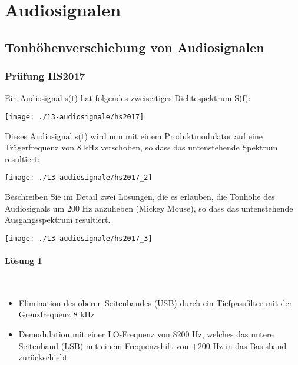 

\section{Audiosignalen}

\subsection{Tonhöhenverschiebung von Audiosignalen}
\subsubsection{Prüfung HS2017}
Ein Audiosignal s(t) hat folgendes zweiseitiges Dichtespektrum S(f):

\begin{center}
    \vspace{-8pt}
    \texttt{[image: ./13-audiosignale/hs2017]}
    \vspace{-8pt}
\end{center}

Dieses Audiosignal s(t) wird nun mit einem Produktmodulator auf eine Trägerfrequenz von 8 kHz verschoben, so dass das untenstehende Spektrum resultiert:
\begin{center}
    \vspace{-8pt}
    \texttt{[image: ./13-audiosignale/hs2017\_2]}
    \vspace{-8pt}
\end{center}

Beschreiben Sie im Detail zwei Lösungen, die es erlauben, die Tonhöhe des Audiosignals um 200 Hz anzuheben (Mickey Mouse), so dass das untenstehende Ausgangsspektrum resultiert.
\begin{center}
    \vspace{-8pt}
    \texttt{[image: ./13-audiosignale/hs2017\_3]}
    \vspace{-8pt}
\end{center}

\paragraph{Lösung 1}\mbox{}\\
\begin{itemize}
    \item Elimination des oberen Seitenbandes (USB) durch ein Tiefpassfilter mit der Grenzfrequenz 8 kHz
    \item Demodulation mit einer LO-Frequenz von 8200 Hz, welches das untere Seitenband (LSB) mit einem Frequenzshift von +200 Hz in das Basisband zurückschiebt
\end{itemize}

